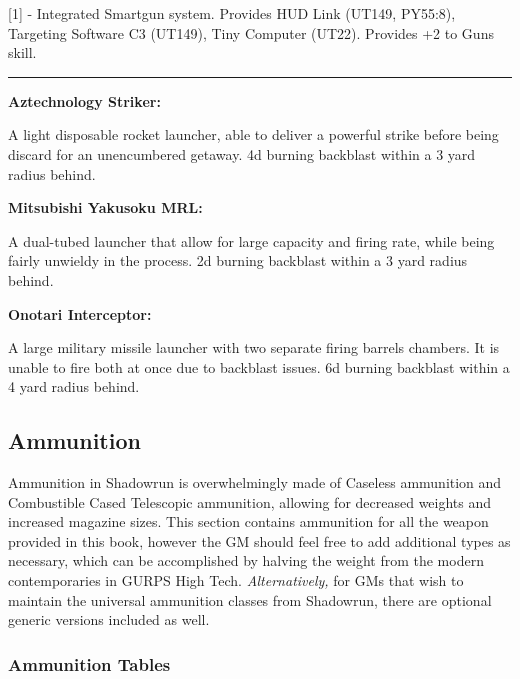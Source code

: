 [1] - Integrated Smartgun system. Provides HUD Link (UT149, PY55:8), Targeting Software C3 (UT149), Tiny Computer (UT22). Provides +2 to Guns skill.

\par\rule{\textwidth}{0.5pt} 

\begin{mdframed}[linewidth=0pt]
\begin{multicols}{2}
	
	\textbf{Aztechnology Striker:}
	
	A light disposable rocket launcher, able to deliver a powerful strike before being discard for an unencumbered getaway. 4d burning backblast within a 3 yard radius behind.
	
	\textbf{Mitsubishi Yakusoku MRL:}
	
	A dual-tubed launcher that allow for large capacity and firing rate, while being fairly unwieldy in the process. 2d burning backblast within a 3 yard radius behind.
	
	\textbf{Onotari Interceptor:}
	
	A large military missile launcher with two separate firing barrels chambers. It is unable to fire both at once due to backblast issues. 6d burning backblast within a 4 yard radius behind.

\end{multicols}
\end{mdframed}

\subsection{Ammunition}

Ammunition in Shadowrun is overwhelmingly made of Caseless ammunition and Combustible Cased Telescopic ammunition, allowing for decreased weights and increased magazine sizes. This section contains ammunition for all the weapon provided in this book, however the GM should feel free to add additional types as necessary, which can be accomplished by halving the weight from the modern contemporaries in GURPS High Tech. \textit{Alternatively,} for GMs that wish to maintain the universal ammunition classes from Shadowrun, there are optional generic versions included as well. \newline

\subsubsection{Ammunition Tables}

